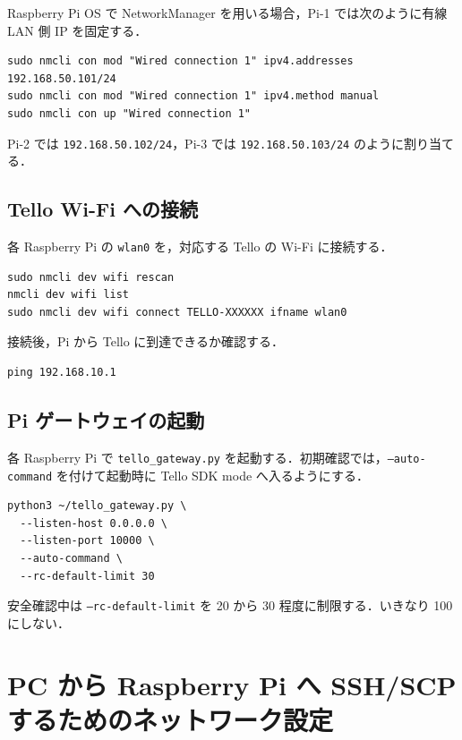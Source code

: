Raspberry Pi OS で NetworkManager を用いる場合，Pi-1 では次のように有線 LAN 側 IP を固定する．

\begin{lstlisting}
sudo nmcli con mod "Wired connection 1" ipv4.addresses 192.168.50.101/24
sudo nmcli con mod "Wired connection 1" ipv4.method manual
sudo nmcli con up "Wired connection 1"
\end{lstlisting}

Pi-2 では \texttt{192.168.50.102/24}，Pi-3 では \texttt{192.168.50.103/24} のように割り当てる．

\subsection{Tello Wi-Fi への接続}

各 Raspberry Pi の \texttt{wlan0} を，対応する Tello の Wi-Fi に接続する．

\begin{lstlisting}
sudo nmcli dev wifi rescan
nmcli dev wifi list
sudo nmcli dev wifi connect TELLO-XXXXXX ifname wlan0
\end{lstlisting}

接続後，Pi から Tello に到達できるか確認する．

\begin{lstlisting}
ping 192.168.10.1
\end{lstlisting}

\subsection{Pi ゲートウェイの起動}

各 Raspberry Pi で \texttt{tello\_gateway.py} を起動する．初期確認では，\texttt{--auto-command} を付けて起動時に Tello SDK mode へ入るようにする．

\begin{lstlisting}
python3 ~/tello_gateway.py \
  --listen-host 0.0.0.0 \
  --listen-port 10000 \
  --auto-command \
  --rc-default-limit 30
\end{lstlisting}

安全確認中は \texttt{--rc-default-limit} を 20 から 30 程度に制限する．いきなり 100 にしない．


\section{PC から Raspberry Pi へ SSH/SCP するためのネットワーク設定}
\label{sec:ssh_scp_setup}

